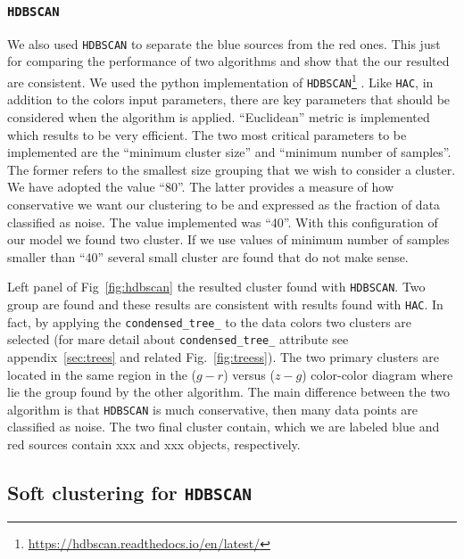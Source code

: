 \documentclass[fleqn,usenatbib]{mnras}
\begin{document}
\subsubsection{\texttt{HDBSCAN}}

We also used \texttt{HDBSCAN} to separate the blue sources from the red ones. This just for
comparing the performance of two algorithms and show that the our resulted are consistent.
We used the python implementation of \texttt{HDBSCAN}\footnote{\url{https://hdbscan.readthedocs.io/en/latest/}}
\citep{McInnes:2017}. Like \texttt{HAC}, in addition to the colors input
parameters,  there are key parameters that should be considered  when the algorithm is
applied. ``Euclidean'' metric is implemented which results to be very efficient. The two most
critical parameters to be implemented are the ``minimum cluster size'' and ``minimum number
of samples''. The former refers to the smallest size grouping that we wish to consider a cluster.
We have adopted the value ``80''. The latter provides a measure of how conservative we want our
clustering to be and expressed as the fraction of data classified as noise.
The value implemented was ``40''. With this configuration of our model we found
two cluster. If we use values of minimum number of samples smaller than ``40'' several small
cluster are found that do not make sense.

Left panel of Fig~\ref{fig:hdbscan} the resulted cluster found with \texttt{HDBSCAN}. Two group are
found and these results are consistent with results found with  \texttt{HAC}.
In fact, by applying the
\texttt{condensed\_tree\_} to the data colors two clusters are selected (for mare detail about
\texttt{condensed\_tree\_} attribute see appendix~\ref{sec:trees} and related
Fig.~\ref{fig:treess}). The two primary clusters are located in the same region in
the ($g - r$) versus ($z - g$) color-color diagram where lie the group found by the other algorithm.
The main difference between the two algorithm is that  \texttt{HDBSCAN}
is much conservative, then many data points are classified as noise. The two final cluster
contain, which we are labeled blue and red sources contain xxx and xxx objects, respectively.

\subsection{Soft clustering for \texttt{HDBSCAN}}
\end{document}
